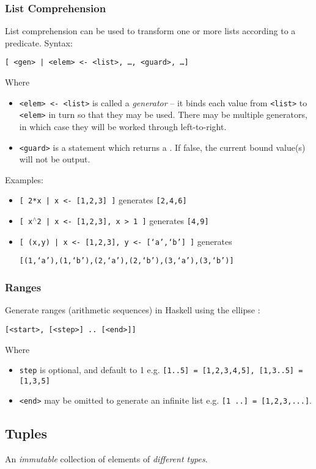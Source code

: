 \subsubsection{List Comprehension}
List comprehension can be used to transform one or more lists according to a predicate. Syntax:
\begin{center}
  \texttt{[ <gen> | <elem> <- <list>, \ldots, <guard>, \ldots ]}
\end{center}

Where
\begin{itemize}
  \item \texttt{<elem> <- <list>} is called a \textit{generator} -- it binds each value from \texttt{<list>} to \texttt{<elem>} in turn so that they may be used. There may be multiple generators, in which case they will be worked through left-to-right.
  \item \texttt{<guard>} is a statement which returns a \texttt{}. If false, the current bound value(s) will not be output.
\end{itemize}

Examples:
\begin{itemize}
  \item \texttt{[ 2*x | x <- [1,2,3] ]} generates \texttt{[2,4,6]}
  \item \texttt{[ x$^{\land}$2 | x <- [1,2,3], x > 1 ]} generates \texttt{[4,9]}
  \item \texttt{[ (x,y) | x <- [1,2,3], y <- [`a',`b'] ]} generates
  
  \texttt{[(1,`a'),(1,`b'),(2,`a'),(2,`b'),(3,`a'),(3,`b')]}
\end{itemize}


\subsubsection{Ranges}
Generate ranges (arithmetic sequences) in Haskell using the ellipse :
\begin{center}
  \texttt{[<start>, [<step>] .. [<end>]]}
\end{center}
Where
\begin{itemize}
  \item \texttt{step} is optional, and default to 1 e.g. \texttt{[1..5] = [1,2,3,4,5], [1,3..5] = [1,3,5]}
  \item \texttt{<end>} may be omitted to generate an infinite list e.g. \texttt{[1 ..] = [1,2,3,...]}.
\end{itemize}


\subsection{Tuples}
An \textit{immutable} collection of elements of \textit{different types}.

